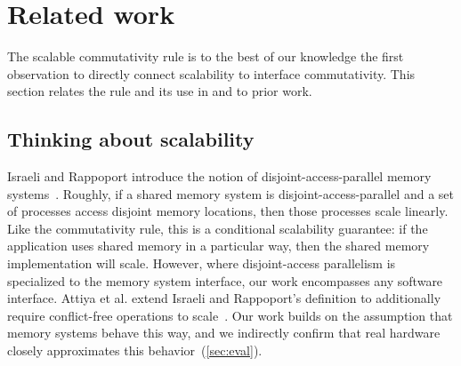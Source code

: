 \section{Related work}
\label{sec:related}


The scalable commutativity rule is to the best of our knowledge the
first observation to directly connect scalability to interface
commutativity.
This section relates the rule and its use
in \sys and \tool to prior work.

\subsection{Thinking about scalability}

Israeli and Rappoport introduce the notion of disjoint-access-parallel
memory systems~\cite{israeli:disjoint-access}.  Roughly, if a shared memory system
is disjoint-access-parallel and a set of processes access disjoint memory
locations, then those processes scale linearly.  Like the commutativity rule,
this is a conditional scalability guarantee: if the application uses shared
memory in a particular way, then the shared memory implementation will scale.
However, where disjoint-access parallelism is specialized to the memory system
interface, our work encompasses any software interface.
%
Attiya et al. extend Israeli and Rappoport's definition to additionally require
conflict-free operations to scale~\cite{attiya:disjoint}.
%
Our work builds on the assumption that
memory systems behave this way, and we indirectly confirm that real hardware
closely approximates this behavior~(\cref{sec:eval}).




